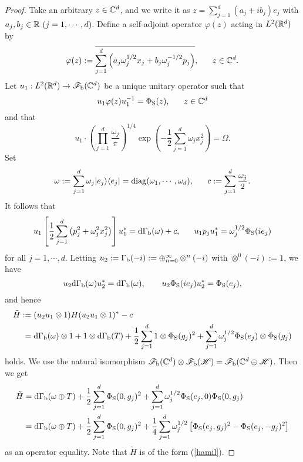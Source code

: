 \documentclass[12pt]{article}
\theoremstyle{plain}
\numberwithin{equation}{section}
\theoremstyle{remark}
\begin{document}
\begin{proof}
Take an arbitrary $z\in\mathbb{C}^d$, and we write it as $z=\sum_{j=1}^{d}(a_j+ib_j)e_j$ with $a_j, b_j\in\mathbb{R}\ (j=1,\cdots,d)$.
Define a self-adjoint operator $\varphi(z)$ acting in $L^2(\mathbb{R}^d)$ by
\[
\varphi(z):=\overline{\sum_{j=1}^d\left(a_j\omega_j^{1/2}x_j
+b_j\omega_j^{-1/2}p_j\right)},\ \ \ \ \ z\in\mathbb{C}^d.
\]
Let $u_1:L^2(\mathbb{R}^d)\to\mathscr{F}_\mathrm{b}(\mathbb{C}^d)$ be a unique unitary operator 
such that
\[
u_1\varphi(z)u_1^{-1}=\Phi_{\rm S}(z), \ \ \ \ \ z\in\CC^d
\]
and that 
\[
u_1\cdot\left(\prod_{j=1}^d\frac{\omega_j}{\pi}\right)^{1/4}
\exp{\left(-\frac{1}{2}\sum_{j=1}^d\omega_j x_j^2\right)}=\Omega.
\]
Set 
\[
\omega:=\sum_{j=1}^d\omega_j|e_j\rangle\langle e_j|={\rm diag}(\omega_1,\cdots,\omega_d),\ \ \ \ \ 
c:=\sum_{j=1}^d\frac{\omega_j}{2}.
\]
It follows that
\[
u_1\left[\frac{1}{2}\sum_{j=1}^d\left(p_j^2  + \omega_j^2 x_j^2\right)\right]u_1^*
= \mathrm{d\Gamma_b}(\omega)+c,
\ \ \ \ \ u_1p_ju_1^*=\omega_j^{1/2}\Phi_{\rm S}(ie_j)
\]
for all $j=1,\cdots,d$.
Letting $u_2:=\Gamma_{\rm b}(-i):=\oplus_{n=0}^\infty\otimes^n(-i)$ with $\otimes^0(-i):=1$, we have
\[
u_2\mathrm{d\Gamma_b}(\omega)u_2^*=\mathrm{d\Gamma_b}(\omega),\qquad u_2\Phi_{\rm S}(ie_j)u_2^*=\Phi_{\rm S}(e_j),
\]
and hence
\begin{align*}
\tilde{H} &:= (u_2u_1\otimes 1)H(u_2u_1\otimes 1)^*-c\\
&\phantom{:} =\mathrm{d\Gamma_b}(\omega)\otimes 1 + 1\otimes\mathrm{d\Gamma_b}(T)+ \frac{1}{2}\sum_{j=1}^d1\otimes\Phi_\mathrm{S}(g_j)^2 + \sum_{j=1}^d\omega_j^{1/2}\Phi_{\rm S}(e_j)\otimes\Phi_\mathrm{S}(g_j)
\end{align*}
holds.
We use the natural isomorphism
$\mathscr{F}_\mathrm{b}(\mathbb{C}^d)\otimes\mathscr{F}_\mathrm{b}(\mathscr{H})=\mathscr{F}_\mathrm{b}(\mathbb{C}^d\oplus\mathscr{H})$.
Then we get
\begin{align*}
\tilde{H}&=\mathrm{d\Gamma_b}(\omega\oplus T)
+\frac{1}{2}\sum_{j=1}^d\Phi_{\rm S}(0,g_j)^2+\sum_{j=1}^d\omega_j^{1/2}\Phi_{\rm S}(e_j,0)\Phi_{\rm S}(0,g_j)\\
&=\mathrm{d\Gamma_b}(\omega\oplus T)
+\frac{1}{2}\sum_{j=1}^d\Phi_{\rm S}(0,g_j)^2
+\frac{1}{4}\sum_{j=1}^d\omega_j^{1/2}\left[\Phi_{\rm S}(e_j,g_j)^2-\Phi_{\rm S}(e_j,-g_j)^2\right]
\end{align*}
as an operator equality.
Note that $\tilde{H}$ is of the form (\ref{hamil}).



\end{proof}
\end{document}
